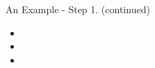 \begin{frame}[t]{An Example - Step 1. (continued)}
  \begin{itemize}
    \setlength{\itemsep}{0.12cm}
      \item {}
      \item {}
      \item {}
  \end{itemize}
\end{frame}
